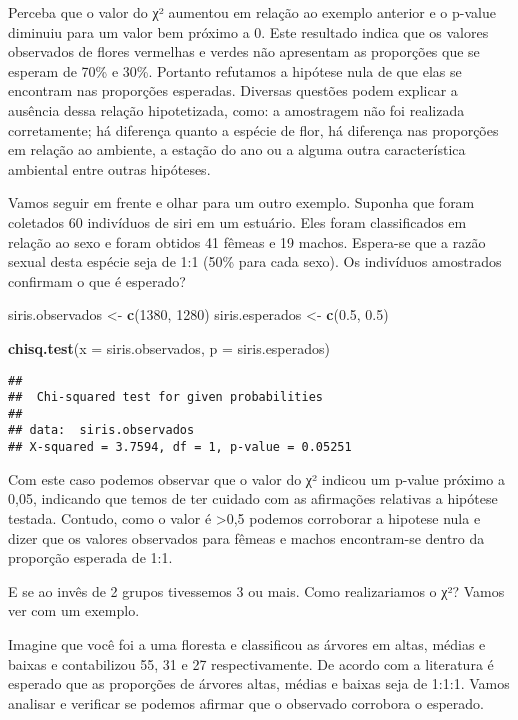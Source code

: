 \documentclass[]{book}
\newenvironment{Shaded}{\begin{snugshade}}{\end{snugshade}}
\newcommand{\DataTypeTok}[1]{\textcolor[rgb]{0.13,0.29,0.53}{#1}}
\newcommand{\DecValTok}[1]{\textcolor[rgb]{0.00,0.00,0.81}{#1}}
\newcommand{\FloatTok}[1]{\textcolor[rgb]{0.00,0.00,0.81}{#1}}
\newcommand{\KeywordTok}[1]{\textcolor[rgb]{0.13,0.29,0.53}{\textbf{#1}}}
\newcommand{\NormalTok}[1]{#1}
\newcommand{\StringTok}[1]{\textcolor[rgb]{0.31,0.60,0.02}{#1}}
\begin{document}
Perceba que o valor do χ² aumentou em relação ao exemplo anterior e o p-value diminuiu para um valor bem próximo a 0. Este resultado indica que os valores observados de flores vermelhas e verdes não apresentam as proporções que se esperam de 70\% e 30\%. Portanto refutamos a hipótese nula de que elas se encontram nas proporções esperadas. Diversas questões podem explicar a ausência dessa relação hipotetizada, como: a amostragem não foi realizada corretamente; há diferença quanto a espécie de flor, há diferença nas proporções em relação ao ambiente, a estação do ano ou a alguma outra característica ambiental entre outras hipóteses.

Vamos seguir em frente e olhar para um outro exemplo. Suponha que foram coletados 60 indivíduos de siri em um estuário. Eles foram classificados em relação ao sexo e foram obtidos 41 fêmeas e 19 machos. Espera-se que a razão sexual desta espécie seja de 1:1 (50\% para cada sexo). Os indivíduos amostrados confirmam o que é esperado?

\begin{Shaded}
\begin{Highlighting}[]
\NormalTok{siris.observados <-}\StringTok{ }\KeywordTok{c}\NormalTok{(}\DecValTok{1380}\NormalTok{, }\DecValTok{1280}\NormalTok{)}
\NormalTok{siris.esperados <-}\StringTok{ }\KeywordTok{c}\NormalTok{(}\FloatTok{0.5}\NormalTok{, }\FloatTok{0.5}\NormalTok{)}

\KeywordTok{chisq.test}\NormalTok{(}\DataTypeTok{x =}\NormalTok{ siris.observados, }\DataTypeTok{p =}\NormalTok{ siris.esperados)}
\end{Highlighting}
\end{Shaded}

\begin{verbatim}
## 
##  Chi-squared test for given probabilities
## 
## data:  siris.observados
## X-squared = 3.7594, df = 1, p-value = 0.05251
\end{verbatim}

Com este caso podemos observar que o valor do χ² indicou um p-value próximo a 0,05, indicando que temos de ter cuidado com as afirmações relativas a hipótese testada. Contudo, como o valor é \textgreater{}0,5 podemos corroborar a hipotese nula e dizer que os valores observados para fêmeas e machos encontram-se dentro da proporção esperada de 1:1.

E se ao invês de 2 grupos tivessemos 3 ou mais. Como realizariamos o χ²? Vamos ver com um exemplo.

Imagine que você foi a uma floresta e classificou as árvores em altas, médias e baixas e contabilizou 55, 31 e 27 respectivamente. De acordo com a literatura é esperado que as proporções de árvores altas, médias e baixas seja de 1:1:1. Vamos analisar e verificar se podemos afirmar que o observado corrobora o esperado.
\end{document}
